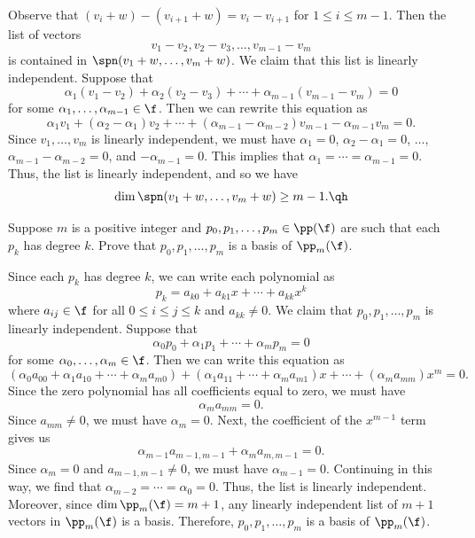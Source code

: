 \begin{sol}
    Observe that $(v_i + w) - (v_{i + 1} + w) = v_i - v_{i + 1}$ for $1 \leq i \leq m - 1$. Then the list of vectors
    \[v_1 - v_2, v_2 - v_3, \ldots, v_{m-1} - v_m\]
    is contained in $\spn(v_1 + w, \ldots, v_m + w)$. We claim that this list is linearly independent. Suppose that
    \[\alpha_1(v_1 - v_2) + \alpha_2(v_2 - v_3) + \cdots + \alpha_{m - 1}(v_{m - 1} - v_m) = 0\]
    for some $\alpha_1, \ldots, \alpha_{m - 1} \in \f$. Then we can rewrite this equation as
    \[\alpha_1 v_1 + (\alpha_2 - \alpha_1)v_2 + \cdots + (\alpha_{m - 1} - \alpha_{m - 2})v_{m - 1} - \alpha_{m - 1} v_m = 0.\]
    Since $v_1, \ldots, v_m$ is linearly independent, we must have $\alpha_1 = 0$, $\alpha_2 - \alpha_1 = 0$, $\ldots$, $\alpha_{m - 1} - \alpha_{m - 2} = 0$, and $-\alpha_{m - 1} = 0$. This implies that $\alpha_1 = \cdots = \alpha_{m - 1} = 0$. Thus, the list is linearly independent, and so we have
    \[\dim \spn(v_1 + w, \ldots, v_m + w) \geq m - 1. \qh\]
\end{sol}

\begin{exercise}[2c9]
    Suppose $m$ is a positive integer and $p_0, p_1, \ldots, p_m \in \pp(\f)$ are such that each $p_k$ has degree $k$. Prove that $p_0, p_1, \ldots, p_m$ is a basis of $\pp_m(\f)$.
\end{exercise}

\begin{sol}
    Since each $p_k$ has degree $k$, we can write each polynomial as
    \[p_k = a_{k0} + a_{k1}x + \cdots + a_{kk}x^k\]
    where $a_{ij} \in \f$ for all $0 \leq i \leq j \leq k$ and $a_{kk} \neq 0$. We claim that $p_0, p_1, \ldots, p_m$ is linearly independent. Suppose that
    \[\alpha_0 p_0 + \alpha_1 p_1 + \cdots + \alpha_m p_m = 0\]
    for some $\alpha_0, \ldots, \alpha_m \in \f$. Then we can write this equation as
    \[(\alpha_0a_{00} + \alpha_1a_{10} + \cdots + \alpha_ma_{m0}) + (\alpha_1a_{11} + \cdots + \alpha_ma_{m1})x + \cdots + (\alpha_ma_{mm})x^m = 0.\]
    Since the zero polynomial has all coefficients equal to zero, we must have
    \[\alpha_m a_{mm} = 0.\]
    Since $a_{mm} \neq 0$, we must have $\alpha_m = 0$. Next, the coefficient of the $x^{m - 1}$ term gives us
    \[\alpha_{m - 1} a_{m - 1, m -1} + \alpha_m a_{m, m - 1} = 0.\]
    Since $\alpha_m = 0$ and $a_{m - 1, m - 1} \neq 0$, we must have $\alpha_{m - 1} = 0$. Continuing in this way, we find that $\alpha_{m - 2} = \cdots = \alpha_0 = 0$. Thus, the list is linearly independent. Moreover, since $\dim \pp_m(\f) = m + 1$, any linearly independent list of $m + 1$ vectors in $\pp_m(\f)$ is a basis. Therefore, $p_0, p_1, \ldots, p_m$ is a basis of $\pp_m(\f)$.
\end{sol}

